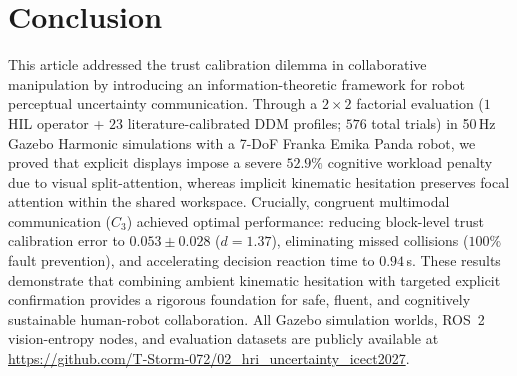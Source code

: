 \documentclass[conference]{IEEEtran}
\begin{document}
\section{Conclusion}
This article addressed the trust calibration dilemma in collaborative manipulation by introducing an information-theoretic framework for robot perceptual uncertainty communication. Through a $2 \times 2$ factorial evaluation ($1$ HIL operator + $23$ literature-calibrated DDM profiles; $576$ total trials) in 50\,Hz Gazebo Harmonic simulations with a 7-DoF Franka Emika Panda robot, we proved that explicit displays impose a severe $52.9\%$ cognitive workload penalty due to visual split-attention, whereas implicit kinematic hesitation preserves focal attention within the shared workspace. Crucially, congruent multimodal communication ($C_3$) achieved optimal performance: reducing block-level trust calibration error to $0.053 \pm 0.028$ ($d = 1.37$), eliminating missed collisions ($100\%$ fault prevention), and accelerating decision reaction time to $0.94$\,s. These results demonstrate that combining ambient kinematic hesitation with targeted explicit confirmation provides a rigorous foundation for safe, fluent, and cognitively sustainable human-robot collaboration. All Gazebo simulation worlds, ROS~2 vision-entropy nodes, and evaluation datasets are publicly available at \url{https://github.com/T-Storm-072/02_hri_uncertainty_icect2027}.
\end{document}
